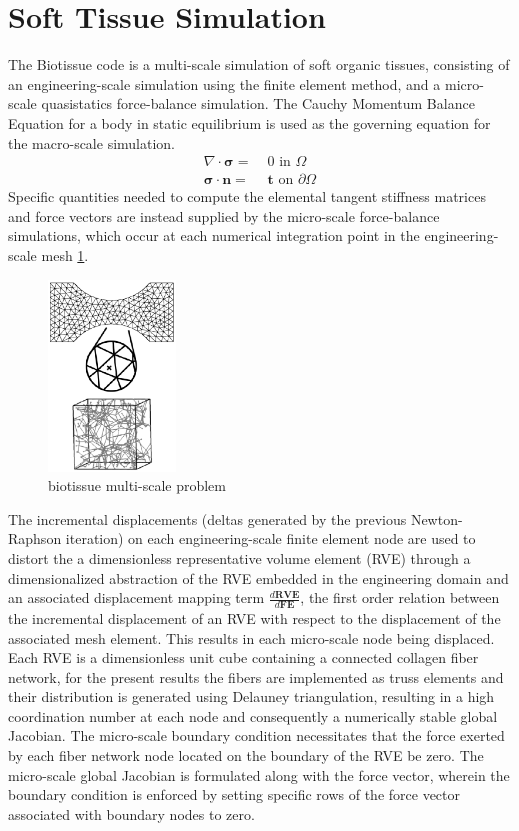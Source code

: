 \documentclass[11pt]{article}
\begin{document}
\section{Soft Tissue Simulation}\label{biotissue}
The Biotissue code is a multi-scale simulation of soft organic tissues, consisting of an engineering-scale simulation using the finite element method, and a micro-scale quasistatics force-balance simulation. The Cauchy Momentum Balance Equation for a body in static equilibrium is used as the governing equation for the macro-scale simulation.
%
\begin{align}
\nabla \cdot \pmb{\sigma} =& \; 0 \text{ in } \Omega \label{momentum_balance} \nonumber \\
\pmb{\sigma} \cdot \pmb{n} =& \; \pmb{t} \text{ on } \partial \Omega \nonumber
\end{align}
%
Specific quantities needed to compute the elemental tangent stiffness matrices and force vectors are instead supplied by the micro-scale force-balance simulations, which occur at each numerical integration point in the engineering-scale mesh \ref{biotissue_hierarchy}.
%
\begin{figure}
  \begin{center}
    \includegraphics[height=2in]{biotissue_visual_hierarchy.eps}
  \end{center}
  \caption{\small biotissue multi-scale problem}
  \label{biotissue_hierarchy}
\end{figure}
%

The incremental displacements (deltas generated by the previous Newton-Raphson iteration) on each engineering-scale finite element node are used to distort the a dimensionless representative volume element (RVE) through a dimensionalized abstraction of the RVE embedded in the engineering domain and an associated displacement mapping term $\frac{d\mathbf{RVE}}{d\mathbf{FE}}$, the first order relation between the incremental displacement of an RVE with respect to the displacement of the associated mesh element. This results in each micro-scale node being displaced. Each RVE is a dimensionless unit cube containing a connected collagen fiber network, for the present results the fibers are implemented as truss elements and their distribution is generated using Delauney triangulation, resulting in a high coordination number at each node and consequently a numerically stable global Jacobian. The micro-scale boundary condition necessitates that the force exerted by each fiber network node located on the boundary of the RVE be zero. The micro-scale global Jacobian is formulated along with the force vector, wherein the boundary condition is enforced by setting specific rows of the force vector associated with boundary nodes to zero.
\end{document}
